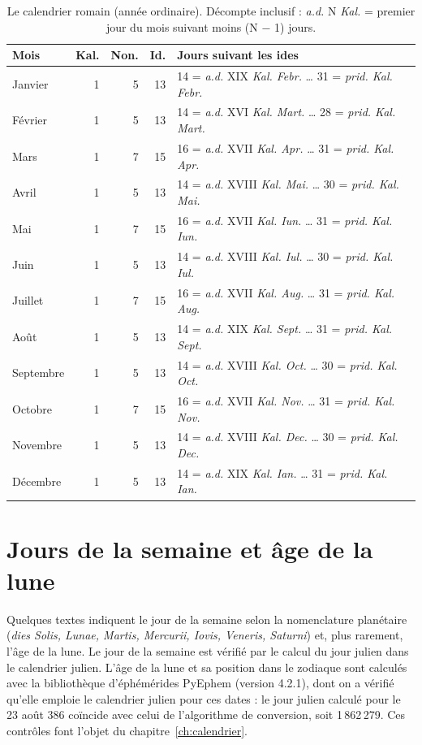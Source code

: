 \begin{table}[tbp]\centering\small
\caption{Le calendrier romain (année ordinaire). Décompte inclusif : \emph{a.d.} N \emph{Kal.} = premier jour du mois suivant moins (N − 1) jours.}\label{tab:calendrier}
\begin{tabular}{@{}l r r r l@{}}\toprule Mois & Kal. & Non. & Id. & Jours suivant les ides\\\midrule
Janvier & 1 & 5 & 13 & 14 = \emph{a.d.} XIX \emph{Kal. Febr.} … 31 = \emph{prid. Kal. Febr.}\\
Février & 1 & 5 & 13 & 14 = \emph{a.d.} XVI \emph{Kal. Mart.} … 28 = \emph{prid. Kal. Mart.}\\
Mars & 1 & 7 & 15 & 16 = \emph{a.d.} XVII \emph{Kal. Apr.} … 31 = \emph{prid. Kal. Apr.}\\
Avril & 1 & 5 & 13 & 14 = \emph{a.d.} XVIII \emph{Kal. Mai.} … 30 = \emph{prid. Kal. Mai.}\\
Mai & 1 & 7 & 15 & 16 = \emph{a.d.} XVII \emph{Kal. Iun.} … 31 = \emph{prid. Kal. Iun.}\\
Juin & 1 & 5 & 13 & 14 = \emph{a.d.} XVIII \emph{Kal. Iul.} … 30 = \emph{prid. Kal. Iul.}\\
Juillet & 1 & 7 & 15 & 16 = \emph{a.d.} XVII \emph{Kal. Aug.} … 31 = \emph{prid. Kal. Aug.}\\
Août & 1 & 5 & 13 & 14 = \emph{a.d.} XIX \emph{Kal. Sept.} … 31 = \emph{prid. Kal. Sept.}\\
Septembre & 1 & 5 & 13 & 14 = \emph{a.d.} XVIII \emph{Kal. Oct.} … 30 = \emph{prid. Kal. Oct.}\\
Octobre & 1 & 7 & 15 & 16 = \emph{a.d.} XVII \emph{Kal. Nov.} … 31 = \emph{prid. Kal. Nov.}\\
Novembre & 1 & 5 & 13 & 14 = \emph{a.d.} XVIII \emph{Kal. Dec.} … 30 = \emph{prid. Kal. Dec.}\\
Décembre & 1 & 5 & 13 & 14 = \emph{a.d.} XIX \emph{Kal. Ian.} … 31 = \emph{prid. Kal. Ian.}\\\bottomrule
\end{tabular}
\end{table}

\section{Jours de la semaine et âge de la lune}

Quelques textes indiquent le jour de la semaine selon la nomenclature planétaire (\emph{dies Solis, Lunae, Martis, Mercurii, Iovis, Veneris, Saturni}) et, plus rarement, l’âge de la lune. Le jour de la semaine est vérifié par le calcul du jour julien dans le calendrier julien. L’âge de la lune et sa position dans le zodiaque sont calculés avec la bibliothèque d’éphémérides PyEphem (version 4.2.1), dont on a vérifié qu’elle emploie le calendrier julien pour ces dates : le jour julien calculé pour le 23 août 386 coïncide avec celui de l’algorithme de conversion, soit 1\,862\,279. Ces contrôles font l’objet du chapitre~\ref{ch:calendrier}.
